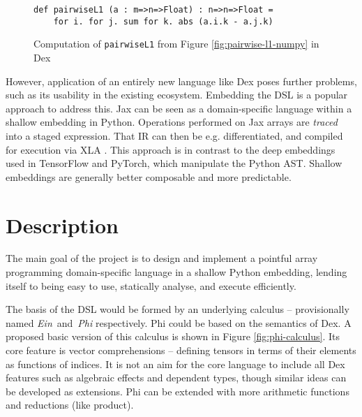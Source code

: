 \begin{figure}[h]
    \centering
    \begin{minipage}{0.6\textwidth}        
    \begin{verbatim}
def pairwiseL1 (a : m=>n=>Float) : n=>n=>Float =
    for i. for j. sum for k. abs (a.i.k - a.j.k) 
    \end{verbatim}
    \end{minipage}
    \caption{Computation of \texttt{pairwiseL1} from Figure \ref{fig:pairwise-l1-numpy} in Dex}
    \label{fig:pairwise-l1-dex}
\end{figure}

However, application of an entirely new language like Dex poses further problems, such as its usability in the existing ecosystem. Embedding the DSL \cite{gibbons2014folding} is a popular approach to address this. Jax \cite{frostig2018compiling} can be seen as a domain-specific language within a shallow embedding in Python. Operations performed on Jax arrays are \textit{traced} into a staged expression. That IR can then be e.g. differentiated, and compiled for execution via XLA . This approach is in contrast to the deep embeddings used in TensorFlow and PyTorch, which manipulate the Python AST. Shallow embeddings are generally better composable and more predictable.

\section{Description}

The main goal of the project is to design and implement a pointful array programming domain-specific language in a shallow Python embedding, lending itself to being easy to use, statically analyse, and execute efficiently.

The basis of the DSL would be formed by an underlying calculus -- provisionally named \textit{Ein}~and~\textit{Phi} respectively. Phi could be based on the semantics of Dex. A proposed basic version of this calculus is shown in Figure \ref{fig:phi-calculus}. Its core feature is vector comprehensions -- defining tensors in terms of their elements as functions of indices. It is not an aim for the core language to include all Dex features such as algebraic effects and dependent types, though similar ideas can be developed as extensions. Phi can be extended with more arithmetic functions and reductions (like product).

